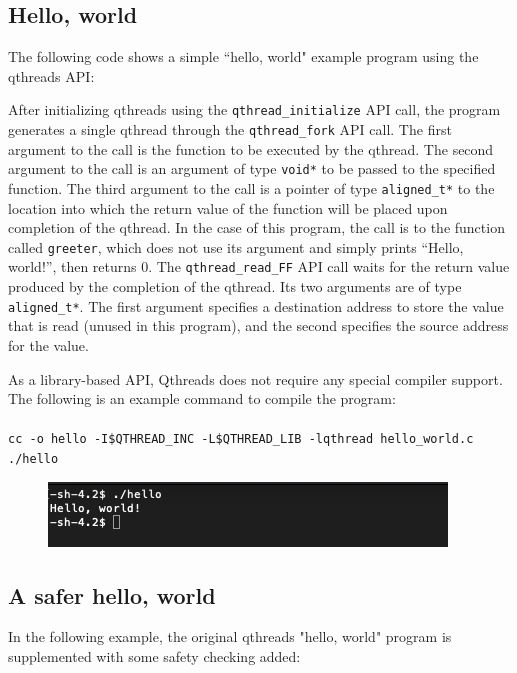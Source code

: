 \documentclass[12pt,fullpage]{article}
\begin{document}
\subsection{Hello, world}

The following code shows a simple ``hello, world" example program using the qthreads API:


After initializing qthreads using the {\tt qthread\_initialize} API call, the program generates a single qthread through the {\tt qthread\_fork} API call.  The first argument to the call is the function to be executed by the qthread.  The second argument to the call is an argument of type {\tt void*} to be passed to the specified function.  The third argument to the call is a pointer of type {\tt aligned\_t*} to the location into which the return value of the function will be placed upon completion of the qthread.  In the case of this program, the call is to the function called {\tt greeter}, which does not use its argument and simply prints ``Hello, world!'', then returns 0.  The {\tt qthread\_read\_FF} API call waits for the return value produced by the completion of the qthread.  Its two arguments are of type {\tt aligned\_t*}.  The first argument specifies a destination address to store the value that is read (unused in this program), and the second specifies the source address for the value.

As a library-based API, Qthreads does not require any special compiler support.  The following is an example command to compile the program:
\\ \\
{\footnotesize{\tt cc -o hello -I\$QTHREAD\_INC -L\$QTHREAD\_LIB -lqthread hello\_world.c}}
\\
{\footnotesize{\tt ./hello}}
\\
\begin{figure}
\includegraphics{images/hello_world.png}
\end{figure}

\subsection{A safer hello, world}

In the following example, the original qthreads "hello, world" program is supplemented with some safety checking added:
\\

\end{document}
